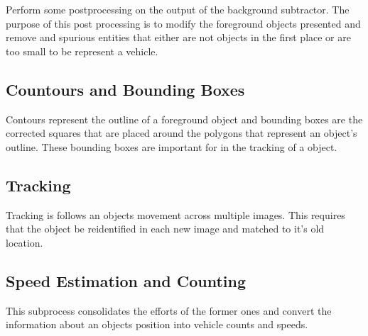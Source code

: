 Perform some postprocessing on the output of the background subtractor. The purpose of this post processing is to modify the foreground objects presented and remove and spurious entities that either are not objects in the first place or are too small to be represent a vehicle.


\subsection{Countours and Bounding Boxes}

Contours represent the outline of a foreground object and bounding boxes are the corrected squares that are placed around the polygons that represent an object's outline. These bounding boxes are important for in the tracking of a object.


\subsection{Tracking}

Tracking is follows an objects movement across multiple images. This requires that the object be reidentified in each new image and matched to it's old location.

\subsection{Speed Estimation and Counting}

This subprocess consolidates the efforts of the former ones and convert the information about an objects position into vehicle counts and speeds.